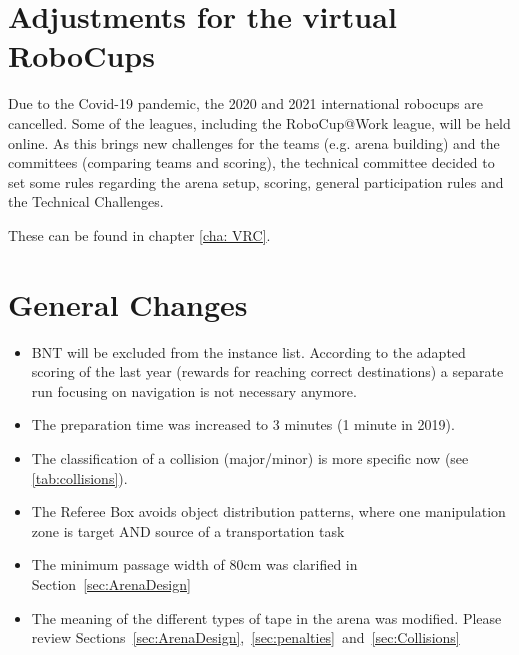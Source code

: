 
\section{Adjustments for the virtual RoboCups}

Due to the Covid-19 pandemic, the 2020 and 2021 international robocups are cancelled. 
Some of the leagues, including the RoboCup@Work league, will be held online.
As this brings new challenges for the teams (e.g. arena building) and the committees (comparing teams and scoring),
the technical committee decided to set some rules regarding the arena setup, scoring, general participation rules and the Technical Challenges.

These can be found in chapter \ref{cha: VRC}.  


\section{General Changes}
\begin{itemize}
  \item BNT will be excluded from the instance list. According to the adapted scoring of the last year (rewards for reaching correct destinations) a separate run focusing on navigation is not necessary anymore.
  \item The preparation time was increased to 3 minutes (1 minute in 2019).
  \item The classification of a collision (major/minor) is more specific now (see \ref{tab:collisions}).
  \item The Referee Box avoids object distribution patterns, where one manipulation zone is target AND source of a transportation task
  \item The minimum passage width of 80cm was clarified in Section~\ref{sec:ArenaDesign}
  \item The meaning of the different types of tape in the arena was modified. Please review Sections~\ref{sec:ArenaDesign},~\ref{sec:penalties}~and~\ref{sec:Collisions}
\end{itemize}

